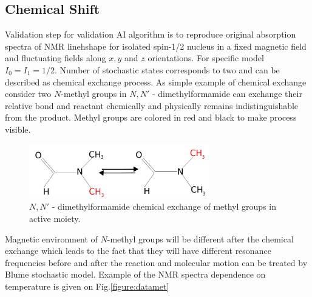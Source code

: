 \subsection{Chemical Shift}\label{blumeinitialmodel}
Validation step for validation AI algorithm is to reproduce original absorption spectra of NMR linehshape for isolated spin-1/2 nucleus in a fixed magnetic field and fluctuating fields along $x,y$ and $z$ orientations. For specific model $I_0=I_1=1/2$. Number of stochastic states corresponds to two and can be described as chemical exchange process. As simple example of chemical exchange consider two $N$-methyl groups in $N,N'$ - dimethylformamide can exchange their relative bond and reactant chemically and physically remains indistinguishable from the product. Methyl groups are colored in red and black to make process visible.       
\begin{figure}[h!]
\centering
\includegraphics[width=0.7\textwidth]{figures/chap2/methil.png}
\caption{$N,N'$ -
dimethylformamide chemical exchange of methyl groups in active moiety.}
\label{figure:methyl}
\end{figure}
Magnetic environment of $N$-methyl groups will be different after the chemical exchange which leads to the fact that they will have different resonance frequencies before and after the reaction and molecular motion can be treated by Blume stochastic model. Example of the NMR spectra dependence on temperature is given on Fig.\ref{figure:datamet} 
